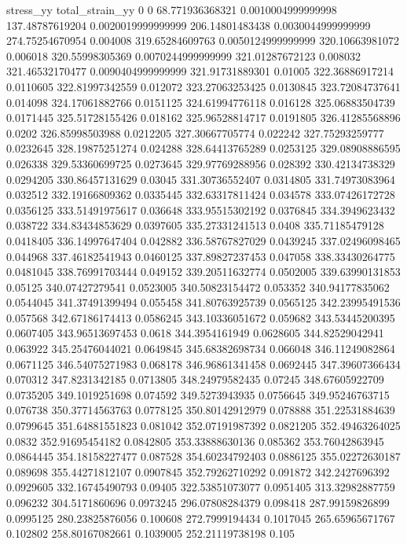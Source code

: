 stress_yy total_strain_yy
0 0
68.771936368321 0.0010004999999998
137.48787619204 0.0020019999999999
206.14801483438 0.0030044999999999
274.75254670954 0.004008
319.65284609763 0.0050124999999999
320.10663981072 0.006018
320.55998305369 0.0070244999999999
321.01287672123 0.008032
321.46532170477 0.0090404999999999
321.91731889301 0.01005
322.36886917214 0.0110605
322.81997342559 0.012072
323.27063253425 0.0130845
323.72084737641 0.014098
324.17061882766 0.0151125
324.61994776118 0.016128
325.06883504739 0.0171445
325.51728155426 0.018162
325.96528814717 0.0191805
326.41285568896 0.0202
326.85998503988 0.0212205
327.30667705774 0.022242
327.75293259777 0.0232645
328.19875251274 0.024288
328.64413765289 0.0253125
329.08908886595 0.026338
329.53360699725 0.0273645
329.97769288956 0.028392
330.42134738329 0.0294205
330.86457131629 0.03045
331.30736552407 0.0314805
331.74973083964 0.032512
332.19166809362 0.0335445
332.63317811424 0.034578
333.07426172728 0.0356125
333.51491975617 0.036648
333.95515302192 0.0376845
334.3949623432 0.038722
334.83434853629 0.0397605
335.27331241513 0.0408
335.71185479128 0.0418405
336.14997647404 0.042882
336.58767827029 0.0439245
337.02496098465 0.044968
337.46182541943 0.0460125
337.89827237453 0.047058
338.33430264775 0.0481045
338.76991703444 0.049152
339.20511632774 0.0502005
339.63990131853 0.05125
340.07427279541 0.0523005
340.50823154472 0.053352
340.94177835062 0.0544045
341.37491399494 0.055458
341.80763925739 0.0565125
342.23995491536 0.057568
342.67186174413 0.0586245
343.10336051672 0.059682
343.53445200395 0.0607405
343.96513697453 0.0618
344.3954161949 0.0628605
344.82529042941 0.063922
345.25476044021 0.0649845
345.68382698734 0.066048
346.11249082864 0.0671125
346.54075271983 0.068178
346.96861341458 0.0692445
347.39607366434 0.070312
347.8231342185 0.0713805
348.24979582435 0.07245
348.67605922709 0.0735205
349.1019251698 0.074592
349.5273943935 0.0756645
349.95246763715 0.076738
350.37714563763 0.0778125
350.80142912979 0.078888
351.22531884639 0.0799645
351.64881551823 0.081042
352.07191987392 0.0821205
352.49463264025 0.0832
352.91695454182 0.0842805
353.33888630136 0.085362
353.76042863945 0.0864445
354.18158227477 0.087528
354.60234792403 0.0886125
355.02272630187 0.089698
355.44271812107 0.0907845
352.79262710292 0.091872
342.2427696392 0.0929605
332.16745490793 0.09405
322.53851073077 0.0951405
313.32982887759 0.096232
304.5171860696 0.0973245
296.07808284379 0.098418
287.99159826899 0.0995125
280.23825876056 0.100608
272.7999194434 0.1017045
265.65965671767 0.102802
258.80167082661 0.1039005
252.21119738198 0.105
